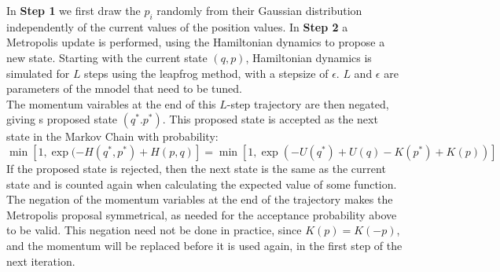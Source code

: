 \documentclass[]{report}
\begin{document}
In \textbf{Step 1} we first draw the $p_{i}$ randomly from their Gaussian distribution independently of the current values of the position values. 
In \textbf{Step 2} a Metropolis update is performed, using the Hamiltonian dynamics to propose a new state. Starting with the current state $(q,p)$, Hamiltonian dynamics is simulated for $L$ steps using the leapfrog method, with a stepsize of $\epsilon$. $L$ and $\epsilon$ are parameters of the mnodel that need to be tuned.\\
The momentum vairables at the end of this $L$-step trajectory are then negated, giving s proposed state $(q^{*}. p^{*})$. This proposed state is accepted as the next state in the Markov Chain with probability: \begin{equation}
\min[1, \exp(-H(q^{*}, p^{*}) + H(p,q)] = \min[1, \exp(-U(q^{*}) + U(q) - K(p^{*}) + K(p))]
\end{equation} 
If the proposed state is rejected, then the next state is the same as the current state and is counted again when calculating the expected value of some function. 
The negation of the momentum variables at the end of the trajectory makes the Metropolis proposal symmetrical, as needed for the acceptance probability above to be valid. This negation need not be done in practice, since $K(p) = K(-p)$, and the momentum will be replaced before it is used again, in the first step of the next iteration.\label{key}
\end{document}
